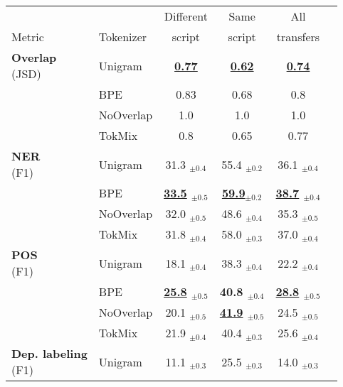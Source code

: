 \begin{table*}[!htb]
\centering
\footnotesize

\begin{subtable}[t]{.55\linewidth}
    \begin{tabular}[t]{llcccc}
        \toprule
                &        &       Different &       Same &               All \\
        Metric & Tokenizer &       script       &     script         &     transfers          \\
        \midrule
        \multirowcell{4}[0pt][l]{\textbf{Overlap} \\ (JSD)} & Unigram &              \bf{\underline{0.77}} &             \bf{\underline{0.62}} &             \bf{\underline{0.74}} \\
                & BPE &              0.83 &              0.68 &               0.8 \\
                & NoOverlap &               1.0 &               1.0 &               1.0 \\
                & TokMix &               0.8 &              0.65 &              0.77 \\
        \midrule
        \multirowcell{4}[0pt][l]{\textbf{NER} \\ (F1)} & Unigram &  31.3 $_{\pm0.4}$ &  55.4 $_{\pm0.2}$ &  36.1 $_{\pm0.4}$ \\
                & BPE &  \bf{\underline{33.5}} $_{\pm0.5}$ &  \bf{\underline{59.9}}$_{\pm0.2}$ &  \bf{\underline{38.7}} $_{\pm0.4}$ \\
                & NoOverlap &  32.0 $_{\pm0.5}$ &  48.6 $_{\pm0.4}$ &  35.3 $_{\pm0.5}$ \\
                & TokMix &  31.8 $_{\pm0.4}$ &  58.0 $_{\pm0.3}$ &  37.0 $_{\pm0.4}$ \\
        \cline{1-5}
        \multirowcell{4}[0pt][l]{\textbf{POS} \\ (F1)} & Unigram &  18.1 $_{\pm0.4}$ &  38.3 $_{\pm0.4}$ &  22.2 $_{\pm0.4}$ \\
                & BPE &  \bf{\underline{25.8}} $_{\pm0.5}$ &  \bf{40.8} $_{\pm0.4}$ &  \bf{\underline{28.8}} $_{\pm0.5}$ \\
                & NoOverlap &  20.1 $_{\pm0.5}$ &  \bf{\underline{41.9}} $_{\pm0.5}$ &  24.5 $_{\pm0.5}$ \\
                & TokMix &  21.9 $_{\pm0.4}$ &  40.4 $_{\pm0.3}$ &  25.6 $_{\pm0.4}$ \\
        \cline{1-5}
        \multirowcell{4}[0pt][l]{\textbf{Dep. labeling}\\ (F1)} & Unigram &  11.1 $_{\pm0.3}$ &  25.5 $_{\pm0.3}$ &  14.0 $_{\pm0.3}$ \\

\end{tabular}
\end{subtable}
\end{table*}

